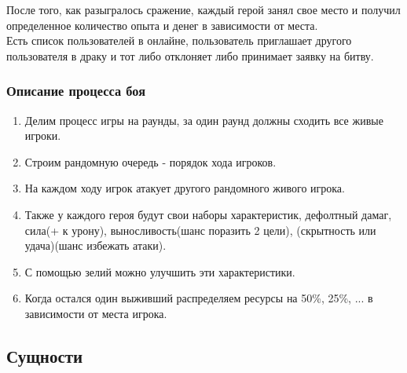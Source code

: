 После того, как разыгралось сражение, каждый герой занял свое место и получил определенное количество опыта и денег в зависимости от места. \\


Есть список пользователей в онлайне, пользователь приглашает другого пользователя в драку и тот либо отклоняет либо принимает заявку на битву.

\subsubsection*{Описание процесса боя}


\begin{enumerate}
    \item Делим процесс игры на раунды, за один раунд должны сходить все живые игроки.

    \item Строим рандомную очередь - порядок хода игроков.
    
    \item На каждом ходу игрок атакует другого рандомного живого игрока.

    \item Также у каждого героя будут свои наборы характеристик, дефолтный дамаг, сила(+ к урону), выносливость(шанс поразить 2 цели), (скрытность или удача)(шанс избежать атаки).

    \item С помощью зелий можно улучшить эти характеристики.

    \item Когда остался один выживший распределяем ресурсы на 50\%, 25\%, ... в зависимости от места игрока.
\end{enumerate}

\subsection*{Сущности}


